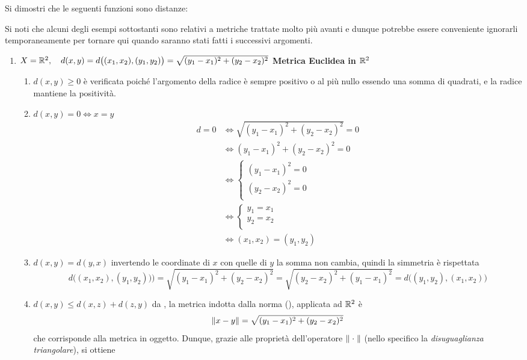 \begin{example}
	\label{ex:metriche}
	Si dimostri che le seguenti funzioni sono distanze:
	\begin{note}
		Si noti che alcuni degli esempi sottostanti sono relativi a metriche trattate molto più avanti e dunque potrebbe essere conveniente ignorarli temporaneamente per tornare qui quando saranno stati fatti i successivi argomenti.
	\end{note}
	\begin{enumerate}
		\item $X=\mathbb{R}^2,\quad d(x,y) = d\bigl((x_1,x_2),(y_1,y_2)\bigr) = \sqrt{(y_1-x_1)^2+(y_2-x_2)^2}$ \hfill {\footnotesize\textbf{Metrica Euclidea in $\mathbb{R}^2$}}
			\begin{enumerate}[label=\arabic*]
				\item $d(x,y) \geq 0$ è verificata poiché l'argomento della radice è sempre positivo o al più nullo essendo una somma di quadrati, e la radice mantiene la positività.
				\item $d(x,y) = 0 \iff x = y$
					\begin{align*}
						d = 0 &\iff \sqrt{(y_1-x_1)^2+(y_2-x_2)^2} = 0\\
						&\iff (y_1-x_1)^2+(y_2-x_2)^2 = 0\\
						&\iff \begin{cases}
							(y_1-x_1)^2=0\\
							(y_2-x_2)^2=0\\
						\end{cases}\\
						&\iff
						\begin{cases}
							y_1=x_1\\
							y_2=x_2\\
						\end{cases}\\
						&\iff (x_1,x_2)=(y_1,y_2)
					\end{align*}
				\item $d(x,y) = d(y,x)$ invertendo le coordinate di $x$ con quelle di $y$ la somma non cambia, quindi la simmetria è rispettata
					\[d\bigl((x_1,x_2),(y_1,y_2)\bigr) \bigr) = \sqrt{(y_1-x_1)^2+(y_2-x_2)^2} = \sqrt{(y_2-x_2)^2+(y_1-x_1)^2} = d\bigl((y_1,y_2),(x_1,x_2)\bigr)\]
				\item $d(x,y) \leq d(x,z) + d(z,y)$ da , la metrica indotta dalla norma (), applicata ad $\mathbb{R}^2$ è
					\[\left\|x - y\right\| = \sqrt{(y_1-x_1)^2+(y_2-x_2)^2}\]
					che corrisponde alla metrica in oggetto. Dunque, grazie alle proprietà dell'operatore $\left\|\;\cdot\;\right\|$ (nello specifico la \textit{disuguaglianza triangolare}), si ottiene

\end{enumerate}
\end{enumerate}
\end{example}
